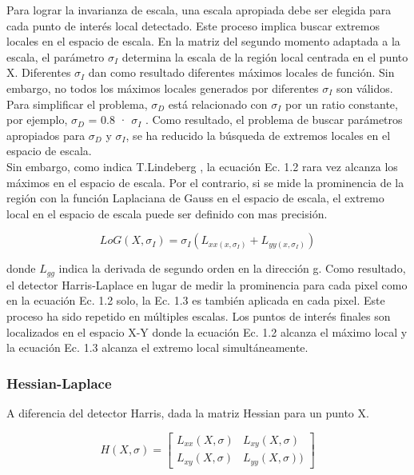 Para lograr la invarianza de escala, una escala apropiada debe ser elegida para cada punto de interés local detectado. Este proceso implica buscar extremos locales en el espacio de escala. En la matriz del segundo momento adaptada a la escala, el parámetro $\sigma_{I}$ determina la escala de la región local centrada en el punto X. Diferentes $\sigma_{I}$ dan como resultado diferentes máximos locales de función. Sin embargo, no todos los máximos locales generados por diferentes $\sigma_{I}$ son válidos.  Para simplificar el problema, $\sigma_{D}$ está relacionado con $\sigma_{I}$ por un ratio constante, por ejemplo, $\sigma_{D}$ = 0.8 · $\sigma_{I}$ . Como resultado, el problema de buscar parámetros apropiados para $\sigma_{D}$ y $\sigma_{I}$, se ha reducido la búsqueda de extremos locales en el espacio de escala. \\

Sin embargo, como indica T.Lindeberg \cite{Reference26}, la ecuación Ec. 1.2 rara vez alcanza los máximos en el espacio de escala. Por el contrario, si se mide la prominencia de la región con la función Laplaciana de Gauss en el espacio de escala, el extremo local en el espacio de escala puede ser definido con mas precisión.

\[
LoG(X, \sigma_{I}) = \sigma_{I}(L_{xx(x, \sigma_{I})} + L_{yy(x, \sigma_{I})})
\]

donde $L_{gg}$ indica la derivada de segundo orden en la dirección g. Como resultado, el detector Harris-Laplace en lugar de medir la prominencia para cada pixel como en la ecuación Ec. 1.2 solo, la Ec. 1.3 es también aplicada en cada pixel. Este proceso ha sido repetido en múltiples escalas. Los puntos de interés finales son localizados en el espacio X-Y donde la ecuación Ec. 1.2 alcanza el máximo local y la ecuación Ec. 1.3 alcanza el extremo local simultáneamente. \\


\subsubsection{Hessian-Laplace}

A diferencia del detector Harris, dada la matriz Hessian para un punto X.

\[
H(X, \sigma) = \begin{bmatrix}
 L_{xx}(X, \sigma) &  L_{xy}(X, \sigma)  \\ 
 L_{xy}(X, \sigma)  &  L_{yy}(X, \sigma))
\end{bmatrix}
\]

